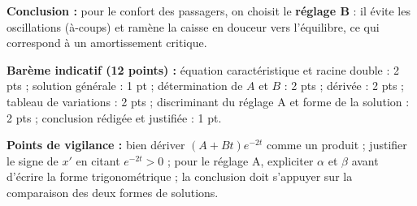 \documentclass[11pt]{article}
\begin{document}
\begin{corrige}
\begin{enumerate}
\textbf{Conclusion :} pour le confort des passagers, on choisit le \textbf{réglage B} : il évite les oscillations (à-coups) et ramène la caisse en douceur vers l'équilibre, ce qui correspond à un amortissement critique.
\end{enumerate}
\textbf{Barème indicatif (12 points) :} équation caractéristique et racine double : 2 pts ; solution générale : 1 pt ; détermination de $A$ et $B$ : 2 pts ; dérivée : 2 pts ; tableau de variations : 2 pts ; discriminant du réglage A et forme de la solution : 2 pts ; conclusion rédigée et justifiée : 1 pt.

\textbf{Points de vigilance :} bien dériver $(A + Bt)e^{-2t}$ comme un produit ; justifier le signe de $x'$ en citant $e^{-2t} > 0$ ; pour le réglage A, expliciter $\alpha$ et $\beta$ avant d'écrire la forme trigonométrique ; la conclusion doit s'appuyer sur la comparaison des deux formes de solutions.
\end{corrige}
\end{document}
